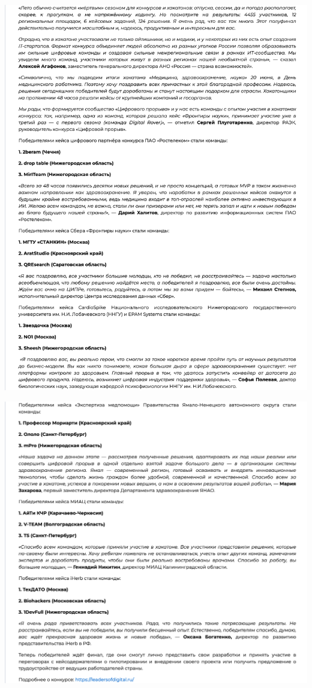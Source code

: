 \Continuing
\begin{center}
    \includegraphics[width=40em]{rsv-news-p2}
\end{center}
\WillContinue
\pagebreak

\Continuing
\begin{center}
    \includegraphics[width=40em]{rsv-news-p3}
\end{center}

\pagebreak

